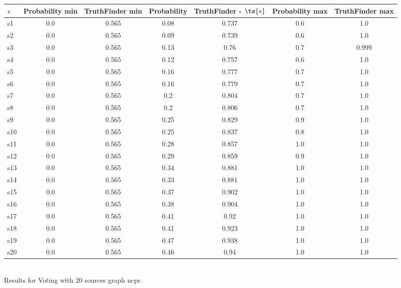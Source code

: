 \documentclass{article}
\begin{document}
\noindent\begin{tabular}{|l|c|c|c|c|c|c|}
\hline
$s$& Probability min & TruthFinder min & Probability & TruthFinder - $\ts{s}$ & Probability max & TruthFinder max\\
\hline
s1 &0.0 & 0.565 & 0.08 & 0.737 & 0.6 & 1.0\\
\hline
s2 &0.0 & 0.565 & 0.09 & 0.739 & 0.6 & 1.0\\
\hline
s3 &0.0 & 0.565 & 0.13 & 0.76 & 0.7 & 0.999\\
\hline
s4 &0.0 & 0.565 & 0.12 & 0.757 & 0.6 & 1.0\\
\hline
s5 &0.0 & 0.565 & 0.16 & 0.777 & 0.7 & 1.0\\
\hline
s6 &0.0 & 0.565 & 0.16 & 0.779 & 0.7 & 1.0\\
\hline
s7 &0.0 & 0.565 & 0.2 & 0.804 & 0.7 & 1.0\\
\hline
s8 &0.0 & 0.565 & 0.2 & 0.806 & 0.7 & 1.0\\
\hline
s9 &0.0 & 0.565 & 0.25 & 0.829 & 0.9 & 1.0\\
\hline
s10 &0.0 & 0.565 & 0.25 & 0.837 & 0.8 & 1.0\\
\hline
s11 &0.0 & 0.565 & 0.28 & 0.857 & 1.0 & 1.0\\
\hline
s12 &0.0 & 0.565 & 0.29 & 0.859 & 0.9 & 1.0\\
\hline
s13 &0.0 & 0.565 & 0.34 & 0.881 & 1.0 & 1.0\\
\hline
s14 &0.0 & 0.565 & 0.33 & 0.881 & 1.0 & 1.0\\
\hline
s15 &0.0 & 0.565 & 0.37 & 0.902 & 1.0 & 1.0\\
\hline
s16 &0.0 & 0.565 & 0.38 & 0.904 & 1.0 & 1.0\\
\hline
s17 &0.0 & 0.565 & 0.41 & 0.92 & 1.0 & 1.0\\
\hline
s18 &0.0 & 0.565 & 0.41 & 0.923 & 1.0 & 1.0\\
\hline
s19 &0.0 & 0.565 & 0.47 & 0.938 & 1.0 & 1.0\\
\hline
s20 &0.0 & 0.565 & 0.46 & 0.94 & 1.0 & 1.0\\
\hline
\end{tabular}\\

\noindent Results for Voting with 20 sources graph ncpr.
\end{document}
